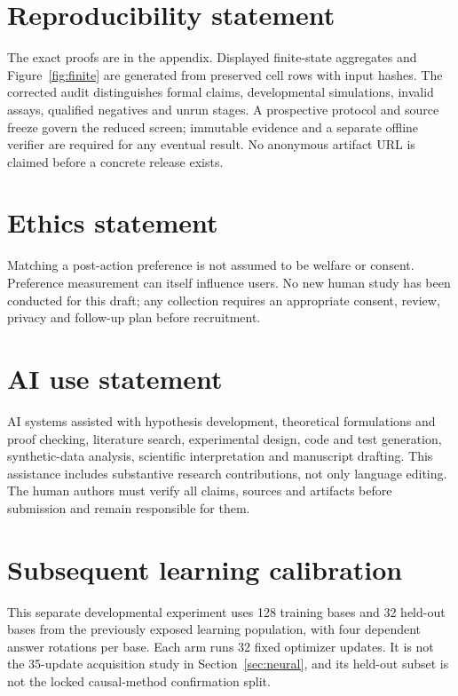 \documentclass{article}
\begin{document}
\section*{Reproducibility statement}
The exact proofs are in the appendix. Displayed finite-state aggregates and
Figure~\ref{fig:finite} are generated from preserved cell rows with input hashes.
The corrected audit distinguishes formal claims, developmental simulations,
invalid assays, qualified negatives and unrun stages. A prospective protocol
and source freeze govern the reduced screen; immutable evidence and a separate
offline verifier are required for any eventual result. No anonymous artifact
URL is claimed before a concrete release exists.

\section*{Ethics statement}
Matching a post-action preference is not assumed to be welfare or consent.
Preference measurement can itself influence users. No new human study has been
conducted for this draft; any collection requires an appropriate consent,
review, privacy and follow-up plan before recruitment.

\section*{AI use statement}
AI systems assisted with hypothesis development, theoretical formulations and
proof checking, literature search, experimental design, code and test generation,
synthetic-data analysis, scientific interpretation and manuscript drafting.
This assistance includes substantive research contributions, not only language
editing. The human authors must verify all claims, sources and artifacts before
submission and remain responsible for them.



\clearpage
\appendix

\section{Subsequent learning calibration}
\label{app:calibration}
This separate developmental experiment uses 128 training bases and 32 held-out
bases from the previously exposed learning population, with four dependent
answer rotations per base. Each arm runs 32 fixed optimizer updates. It is not
the 35-update acquisition study in Section~\ref{sec:neural}, and its held-out
subset is not the locked causal-method confirmation split.
\end{document}

